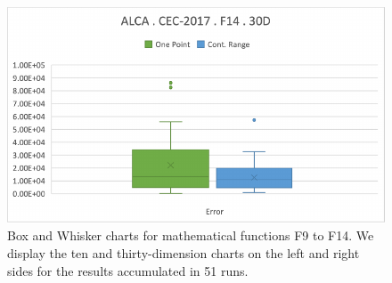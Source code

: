 \documentclass[graybox]{svmult}
\begin{document}
\begin{figure}[!ht]
\begin{minipage}[h]{0.49\linewidth}
        \end{minipage}
        \hfill
        \begin{minipage}[h]{0.49\linewidth}
            \includegraphics[width=1\linewidth]{img/fig_experiment_F14x30D.pdf} 
        \end{minipage}

        \caption{Box and Whisker charts for mathematical functions F9 to F14. We display the ten and thirty-dimension charts on the left and right sides for the results accumulated in 51 runs.} \label{fig.experiment_F9-F14}
    \end{figure}

    \FloatBarrier
\end{document}
